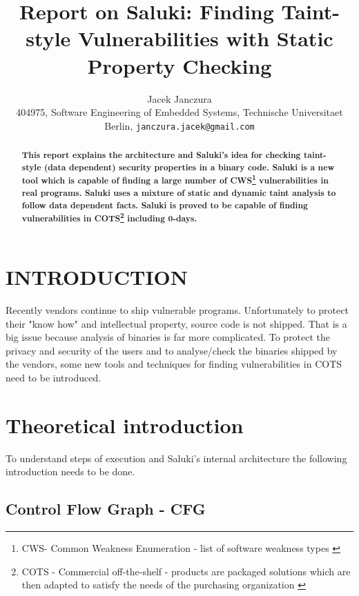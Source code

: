 \documentclass[a4paper, 12pt, journal, onecolumn]{IEEEtran}
\title{\LARGE \bf
Report on Saluki: Finding Taint-style Vulnerabilities with Static Property Checking
}
\author{Jacek Janczura \\ \small{404975, Software Engineering of Embedded Systems, Technische Universitaet Berlin, {\tt janczura.jacek@gmail.com}}}%
\begin{document}
\maketitle
\thispagestyle{fancy}
\pagestyle{fancy}


\begin{abstract}
\textbf{This report explains the architecture and Saluki's idea for checking taint-style (data dependent) security properties in a binary code. Saluki is a new tool which is capable of finding a large number of CWS\footnote{CWS- Common Weakness Enumeration - list of software weakness types \cite{a2}} vulnerabilities in real programs. Saluki uses a mixture of static and dynamic taint analysis to follow data dependent facts. Saluki is proved to be capable of finding vulnerabilities in COTS\footnote{ COTS - Commercial off-the-shelf -  products are packaged solutions which are then adapted to satisfy the needs of the purchasing organization \cite{a1}} including 0-days.}

\end{abstract}


\section{INTRODUCTION}

Recently vendors continue to ship vulnerable programs. Unfortunately to protect their "know how" and intellectual property, source code is not shipped. That is a big issue because analysis of binaries is far more complicated. To protect the privacy and security of the users and to analyse/check the binaries shipped by the vendors, some new tools and techniques for finding vulnerabilities in COTS need to be introduced. \cite{saluki} 

\section{Theoretical introduction}

To understand steps of execution and Saluki's internal architecture the following introduction needs to be done.

\subsection{Control Flow Graph - CFG}
\end{document}
